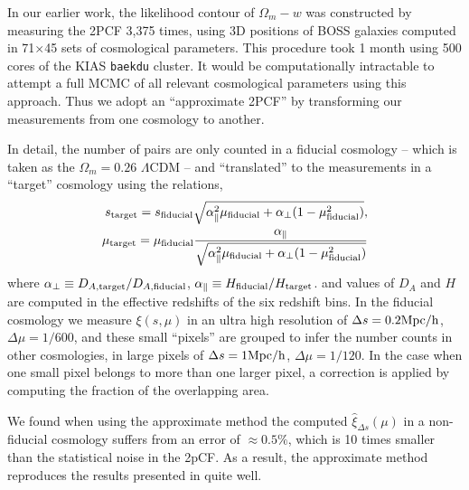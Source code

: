 \documentclass[prl,twocolumn,superscriptaddress,aps,amsmath,amssymb,nofootinbib,altaffilletter]{revtex4}
\begin{document}
In our earlier work\cite{Li2016}, the likelihood contour of $\Omega_m-w$ was constructed by
measuring the 2PCF 3,375 times,
using 3D positions of BOSS galaxies computed in 71$\times$45 sets of cosmological parameters.
This procedure took 1 month using 500 cores of the KIAS {\texttt {baekdu}} cluster.
It would be computationally intractable to attempt a full MCMC of all relevant cosmological parameters using this approach. 
Thus we adopt an ``approximate 2PCF'' by transforming our measurements from one cosmology to another.

In detail, the number of pairs are only counted in a fiducial cosmology
-- which is taken as the $\Omega_m=0.26$ $\Lambda$CDM --
and ``translated'' to the measurements in a ``target'' cosmology using the relations, 
\begin{eqnarray}
 s_{\rm target} = s_{\rm fiducial} \sqrt{\alpha_{\parallel}^2 \mu_{\rm fiducial}+\alpha_{\bot}(1-\mu_{\rm fiducial}^2)}, \\
 \mu_{\rm target} = \mu_{\rm fiducial} \frac{\alpha_\parallel}
 {\sqrt{\alpha_{\parallel}^2 \mu_{\rm fiducial} +\alpha_{\bot}(1-\mu_{\rm fiducial}^2)}}
\end{eqnarray}
where $\alpha_{\bot}\equiv D_{A,\rm target}/D_{A,\rm fiducial}$,
$\alpha_{\parallel}\equiv H_{\rm fiducial}/H_{\rm target}$.
and values of $D_A$ and $H$ are computed in the effective redshifts of the six redshift bins.
In the fiducial cosmology
we measure $\xi(s,\mu)$ in an ultra high resolution of
$\Delta s = 0.2 {\rm Mpc/h}$, $\Delta \mu = 1/600$,
and these small ``pixels'' are grouped to infer 
the number counts in other cosmologies, 
in large pixels of $\Delta s = 1 {\rm Mpc/h}$, $\Delta \mu = 1/120$.
In the case when one small pixel belongs to more than one larger pixel,
a correction is applied by computing the fraction of the overlapping area.

We found when using the approximate method the computed 
$\hat\xi_{\Delta s}(\mu)$ in a non-fiducial cosmology suffers from
an error of $\approx0.5\%$, which is 10 times smaller than 
the statistical noise in the 2pCF.
As a result, the approximate method reproduces the results presented in \cite{Li2016} quite well.
\end{document}
